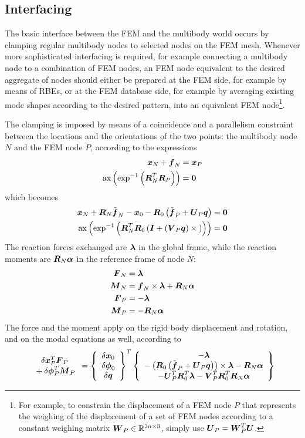 \subsection{Interfacing}
The basic interface between the FEM and the multibody world occurs 
by clamping regular multibody nodes to selected nodes on the FEM mesh.
Whenever more sophisticated interfacing is required, for example 
connecting a multibody node to a combination of FEM nodes, 
an FEM node equivalent to the desired aggregate of nodes 
should either be prepared at the FEM side, for example by means of RBEs,
or at the FEM database side, for example by averaging existing mode shapes
according to the desired pattern, into an equivalent FEM node\footnote{%
%
For example, to constrain the displacement of a FEM node $P$ 
that represents the weighing of the displacement of a set of FEM nodes
according to a constant weighing matrix $\boldsymbol{W}_P\in\mathbb{R}^{3n\times{3}}$,
simply use $\boldsymbol{U}_P=\boldsymbol{W}_P^T\boldsymbol{U}$.
}.

The clamping is imposed by means of a coincidence and a parallelism
constraint between the locations and the orientations of the two points:
the multibody node $N$ and the FEM node $P$, according to the expressions
\begin{align}
	\boldsymbol{x}_N + \boldsymbol{f}_N &= \boldsymbol{x}_P \\
	\mathrm{ax}\left( \mathrm{exp}^{-1}\left( \boldsymbol{R}_N^T \boldsymbol{R}_P \right) \right) &= \boldsymbol{0}
\end{align}
which becomes
\begin{align}
	\boldsymbol{x}_N + \boldsymbol{R}_N \tilde{\boldsymbol{f}}_N
	- \boldsymbol{x}_0 - \boldsymbol{R}_0 \left( \tilde{\boldsymbol{f}}_P + \boldsymbol{U}_P \boldsymbol{q} \right) &= \boldsymbol{0}
		\label{eq:modal:pos-constr} \\
	\mathrm{ax}\left( \mathrm{exp}^{-1}\left( \boldsymbol{R}_N^T \boldsymbol{R}_0 \left( \boldsymbol{I} + \left( \boldsymbol{V}_P \boldsymbol{q} \right)\times{} \right) \right) \right) &= \boldsymbol{0}
		\label{eq:modal:rot-constr}
\end{align}
The reaction forces exchanged are $\boldsymbol{\lambda}$ in the global frame, 
while the reaction moments are $\boldsymbol{R}_N \boldsymbol{\alpha}$ in the reference frame 
of node $N$:
\begin{align}
	\boldsymbol{F}_N &= \boldsymbol{\lambda} \\
	\boldsymbol{M}_N &= \boldsymbol{f}_N \times \boldsymbol{\lambda} + \boldsymbol{R}_N \boldsymbol{\alpha} \\
	\boldsymbol{F}_P &= - \boldsymbol{\lambda} \\
	\boldsymbol{M}_P &= - \boldsymbol{R}_N \boldsymbol{\alpha}
\end{align}
The force and the moment apply on the rigid body displacement and rotation,
and on the modal equations as well, according to
\begin{equation}
	\begin{array}{c} 
		\delta\boldsymbol{x}_P^T \boldsymbol{F}_P \\
		\mbox{} + \delta\boldsymbol{\phi}_P^T \boldsymbol{M}_P
	 \end{array}
	= \left\{ \begin{array}{c} 
		\delta\boldsymbol{x}_0 \\
		\delta\boldsymbol{\phi}_0 \\
		\delta\boldsymbol{q}
	 \end{array} \right\}^T \left\{ \begin{array}{c} 
		- \boldsymbol{\lambda} \\
		- \left( \boldsymbol{R}_0 \left( \tilde{\boldsymbol{f}}_P + \boldsymbol{U}_P \boldsymbol{q} \right) \right) \times \boldsymbol{\lambda} - \boldsymbol{R}_N \boldsymbol{\alpha} \\
		- \boldsymbol{U}_P^T \boldsymbol{R}_0^T \boldsymbol{\lambda} - \boldsymbol{V}_P^T \boldsymbol{R}_0^T \boldsymbol{R}_N \boldsymbol{\alpha}
	 \end{array} \right\}
	\label{eq:modal:modal-forces}
\end{equation}

